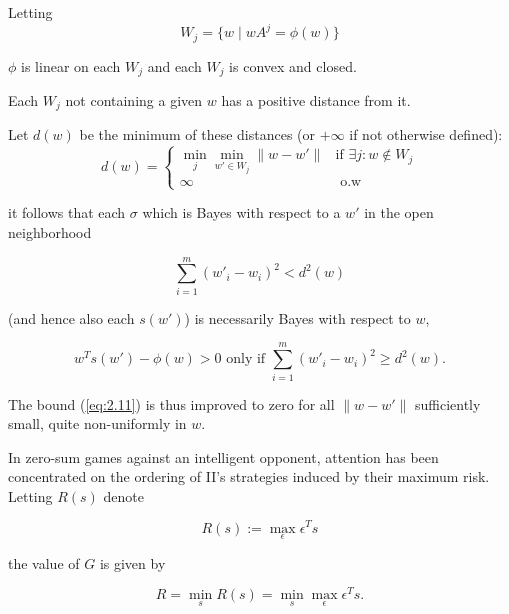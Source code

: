 \documentclass[11pt]{article}
\numberwithin{equation}{section}
\theoremstyle{boldStyle}
\begin{document}
\bigbreak

Letting 
\begin{equation*}
    W_j = \{w \mid wA^j = \phi(w) \} 
\end{equation*}

\(\phi\) is linear on each \( W_j \) and each \( W_j \) is convex and closed. 


Each \( W_j \) not containing a given \( w \) has a positive distance from it. 

Let \( d(w) \) be the minimum of these distances (or \( + \infty \) if not otherwise defined):
\begin{equation*}
    d(w) = 
    \begin{cases}
        \min_{j} \min_{w' \in W_j} \|w - w'\| & \text{if } \exists j : w \notin W_j \\
        \infty & \text{ o.w }
    \end{cases}
\end{equation*}

\begin{bluebox}
it follows that each \(\sigma\) which is Bayes with respect to a \( w' \) in the open neighborhood

\begin{equation*}
\sum_{i=1}^{m} (w'_i - w_i)^2 < d^2(w)
\end{equation*}

(and hence also each  $s(w')$) is necessarily Bayes with respect to \( w \),

\begin{equation} \label{eq:2.15}
w^T s(w') - \phi(w) > 0 \text{ only if } \sum_{i=1}^{m} (w'_i - w_i)^2 \geq d^2(w).
\end{equation}
\end{bluebox}


The bound (\ref{eq:2.11}) is thus improved to zero for all \(\|w - w'\|\) sufficiently small, quite non-uniformly in \( w \).

\bigbreak

In zero-sum games against an intelligent opponent, attention has been concentrated on the ordering of II's 
strategies induced by their maximum risk. Letting \( R(s) \) denote

\begin{equation*}
    R(s) := \max_{\epsilon} \epsilon^T s
\end{equation*}

the value of \( G \) is given by

\begin{equation*}
    R = \min_{s} R(s) = \min_{s} \max_{\epsilon} \epsilon^T s.
\end{equation*}
\end{document}
